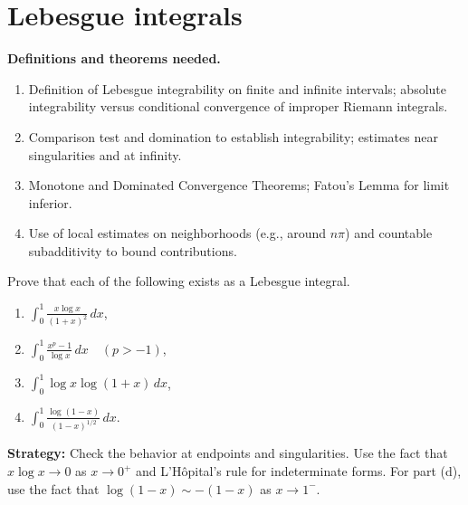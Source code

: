 \section{Lebesgue integrals}

\noindent\textbf{Definitions and theorems needed.}
\begin{enumerate}[label=(\alph*)]
\item Definition of Lebesgue integrability on finite and infinite intervals; absolute integrability versus conditional convergence of improper Riemann integrals.
\item Comparison test and domination to establish integrability; estimates near singularities and at infinity.
\item Monotone and Dominated Convergence Theorems; Fatou's Lemma for limit inferior.
\item Use of local estimates on neighborhoods (e.g., around $n\pi$) and countable subadditivity to bound contributions.
\end{enumerate}



\begin{problembox}
Prove that each of the following exists as a Lebesgue integral.
\begin{enumerate}[label=(\alph*)]
\item $\int_{0}^{1} \frac{x \log x}{(1 + x)^2} \, dx$,
\item $\int_{0}^{1} \frac{x^p - 1}{\log x} \, dx \quad (p > -1)$,
\item $\int_{0}^{1} \log x \log (1 + x) \, dx$,
\item $\int_{0}^{1} \frac{\log (1 - x)}{(1 - x)^{1/2}} \, dx.$
\end{enumerate}
\end{problembox}

\noindent\textbf{Strategy:} Check the behavior at endpoints and singularities. Use the fact that $x \log x \to 0$ as $x \to 0^+$ and L'Hôpital's rule for indeterminate forms. For part (d), use the fact that $\log(1-x) \sim -(1-x)$ as $x \to 1^-$.

